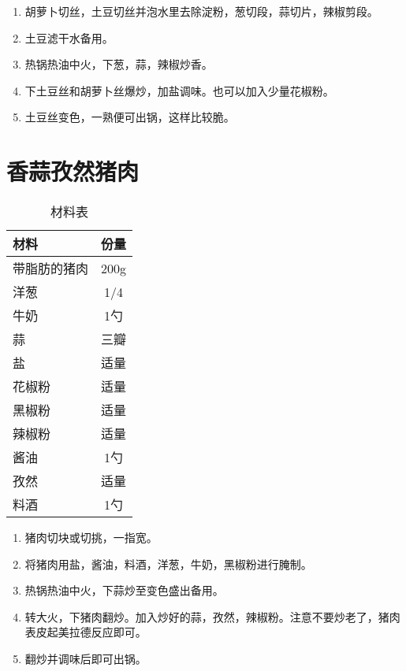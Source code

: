 \begin{enumerate}
    \item 胡萝卜切丝，土豆切丝并泡水里去除淀粉，葱切段，蒜切片，辣椒剪段。
 
    \item 土豆滤干水备用。
     
    \item 热锅热油中火，下葱，蒜，辣椒炒香。
  
    \item 下土豆丝和胡萝卜丝爆炒，加盐调味。也可以加入少量花椒粉。
    
    \item 土豆丝变色，一熟便可出锅，这样比较脆。
\end{enumerate}


\section{香蒜孜然猪肉}

\begin{table}[H]
    \centering
    \begin{tabular}{|l||c|}\hline
     \textbf{材料}    &  \textbf{份量}\\ \hline\hline
    带脂肪的猪肉    &   200g\\ \hline
     洋葱    &  1/4 \\ \hline
    牛奶     &  1勺 \\ \hline
    蒜     & 三瓣  \\ \hline
    盐     & 适量  \\ \hline
    花椒粉     & 适量  \\ \hline
    黑椒粉     & 适量  \\ \hline
    辣椒粉     & 适量  \\ \hline
    酱油     & 1勺  \\ \hline
    孜然     & 适量  \\ \hline
    料酒     & 1勺  \\ \hline
    \end{tabular}
    \caption{材料表}
\end{table}

\begin{enumerate}
    \item 猪肉切块或切挑，一指宽。
 
    \item 将猪肉用盐，酱油，料酒，洋葱，牛奶，黑椒粉进行腌制。
     
    \item 热锅热油中火，下蒜炒至变色盛出备用。
  
    \item 转大火，下猪肉翻炒。加入炒好的蒜，孜然，辣椒粉。注意不要炒老了，猪肉表皮起美拉德反应即可。
    
    \item 翻炒并调味后即可出锅。
\end{enumerate}

